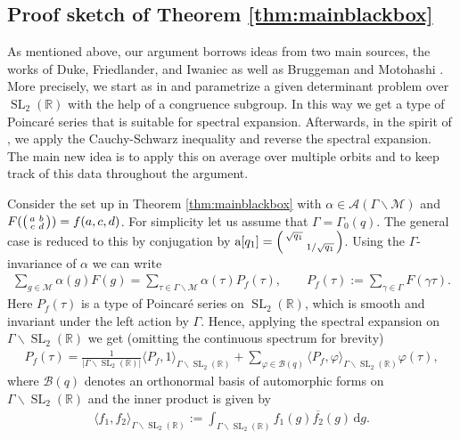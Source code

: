 \documentclass[12pt]{amsart}
\theoremstyle{definition}
\theoremstyle{remark}
\numberwithin{equation}{section}
\newcommand{\B}{\mathcal{B}}
\newcommand{\R}{{\mathbb R}}
\newcommand{\1}{{\mathbf 1}}
\newcommand{\SL}{\operatorname{SL}_2}
\renewcommand{\a}{\mathrm{a}}
\renewcommand{\d}{\mathrm d}
\begin{document}
\subsection{Proof sketch of Theorem \ref{thm:mainblackbox}} As mentioned above, our argument borrows ideas from two main sources, the works of Duke, Friedlander, and Iwaniec \cite{DFIprimes} as well as Bruggeman and Motohashi \cite{BM}. More precisely, we start as in \cite{BM} and parametrize a given determinant problem over $\SL(\R)$ with the help of a congruence subgroup. In this way we get a type of  Poincar\'e series that is suitable for spectral expansion. Afterwards, in the spirit of \cite{DFIprimes}, we apply the Cauchy-Schwarz inequality and reverse the spectral expansion. The main new idea is to apply this on average over multiple orbits and to keep track of this data throughout the argument.

Consider the set up in Theorem \ref{thm:mainblackbox} with $\alpha \in \mathcal{A}(\Gamma \backslash \mathcal{M})$ and $F(\smqty(a & b \\ c& d)) = f(a,c,d)$. For simplicity let us assume that $\Gamma= \Gamma_0(q)$. The general case is reduced to this by conjugation by $\a[q_1] = \smqty(\sqrt{q_1} & \\ & 1/\sqrt{q_1})$. Using the $\Gamma$-invariance of $\alpha$ we can write
\begin{align*}
    \sum_{g \in \mathcal{M}} \alpha(g) F(g) = \sum_{\tau \in \Gamma \backslash \mathcal{M}} \alpha(\tau) P_f(\tau), \quad \quad P_f(\tau):= \sum_{\gamma \in \Gamma} F(\gamma \tau).
\end{align*}
Here $P_f(\tau)$ is a type of Poincar\'e series on $\SL(\R)$, which is smooth and invariant under the left action by $\Gamma$.  Hence, applying the spectral expansion on $\Gamma \backslash \SL(\R)$ we get (omitting the continuous spectrum for brevity)
\begin{align*}
   P_f(\tau) = \frac{1}{|\Gamma \backslash \SL(\R)|} \langle P_f,1 \rangle_{\Gamma \backslash \SL(\R)} + \sum_{\varphi \in \B(q)} \langle P_f, \varphi \rangle_{\Gamma \backslash \SL(\R)} \varphi(\tau), 
\end{align*}
where $\B(q)$ denotes an orthonormal basis of automorphic forms on $\Gamma \backslash \SL(\R)$ and the inner product is given by
\begin{align*}
\langle f_1, f_2 \rangle_{\Gamma \backslash \SL(\R)} := \int_{\Gamma \backslash \SL(\R)} f_1(g) \overline{f_2}(g) \, \d g.
\end{align*}
\end{document}
